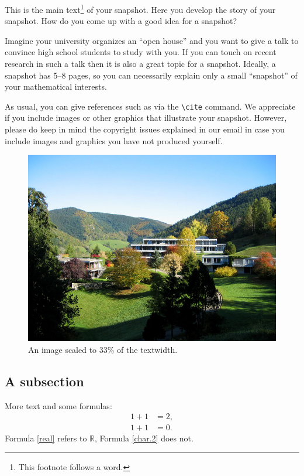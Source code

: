 \documentclass{snapshotmfo}
\begin{document}
This is the main text\footnote{This footnote follows a word.} of your snapshot. Here you develop the story of your snapshot.
How do you come up with a good idea for a snapshot?

Imagine your university organizes an ``open house'' and you want to give a talk to convince high school students to study with you. If you can touch on recent research in such a talk then it is also a great topic for a snapshot. Ideally, a snapshot has 5--8 pages, so you can necessarily explain only a small ``snapshot'' of your mathematical interests.

As usual, you can give references such as \cite{knuth1984texbook, wikiMath, sample13, sample12, sample11, sample14, helfgott14} via the \verb+\cite+ command.
We appreciate if you include images or other graphics that illustrate your snapshot. However, please do keep in mind the copyright issues explained in our email in case you include images and graphics you have not produced yourself.

\begin{figure}[ht]
        \centering
        \includegraphics[width= 0.33 \textwidth]{mfo.jpg}
        \caption{An image scaled to 33\% of the textwidth.}
\label{fig.sample-image}
\end{figure}

\subsection{A subsection}
More text and some formulas:
\begin{align}\label{real}
1+1&=2,\\\label{char.2}
1+1&=0.
\end{align}
Formula \eqref{real} refers to $\mathbb{R}$, Formula \eqref{char.2} does not.
\end{document}
